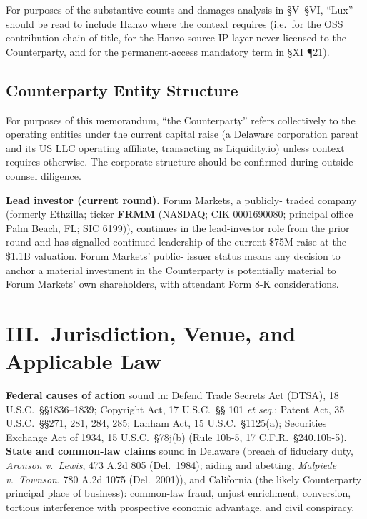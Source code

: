 \documentclass[11pt,letterpaper]{article}
\begin{document}
For purposes of the substantive counts and damages analysis in
\S V--\S VI, ``Lux'' should be read to include Hanzo where the
context requires (i.e.\ for the OSS contribution chain-of-title,
for the Hanzo-source IP layer never licensed to the Counterparty,
and for the permanent-access mandatory term in \S XI ¶21).

\subsection*{Counterparty Entity Structure}

For purposes of this memorandum, ``the Counterparty'' refers
collectively to the operating entities under the current capital
raise (a Delaware corporation parent and its US LLC operating
affiliate, transacting as Liquidity.io) unless context requires
otherwise. The corporate structure should be confirmed during
outside-counsel diligence.

\textbf{Lead investor (current round).} Forum Markets, a publicly-
traded company (formerly Ethzilla; ticker \textbf{FRMM} (NASDAQ; CIK 0001690080; principal office Palm Beach, FL; SIC 6199)), continues in the lead-investor role
from the prior round and has signalled continued leadership of the
current \$75M raise at the \$1.1B valuation. Forum Markets' public-
issuer status means any decision to anchor a material investment in
the Counterparty is potentially material to Forum Markets' own
shareholders, with attendant Form 8-K considerations.

\section*{III.\ Jurisdiction, Venue, and Applicable Law}

\textbf{Federal causes of action} sound in: Defend Trade Secrets Act
(DTSA), 18 U.S.C.\ \S\S 1836--1839; Copyright Act, 17 U.S.C.\ \S\S
101 \emph{et seq.}; Patent Act, 35 U.S.C.\ \S\S 271, 281, 284, 285;
Lanham Act, 15 U.S.C.\ \S 1125(a); Securities Exchange Act of 1934,
15 U.S.C.\ \S 78j(b) (Rule 10b-5, 17 C.F.R.\ \S 240.10b-5).
\textbf{State and common-law claims} sound in Delaware (breach of
fiduciary duty, \emph{Aronson v.\ Lewis}, 473 A.2d 805 (Del.\ 1984);
aiding and abetting, \emph{Malpiede v.\ Townson}, 780 A.2d 1075
(Del.\ 2001)), and California (the likely Counterparty principal
place of business): common-law fraud, unjust enrichment, conversion,
tortious interference with prospective economic advantage, and civil
conspiracy.
\end{document}
